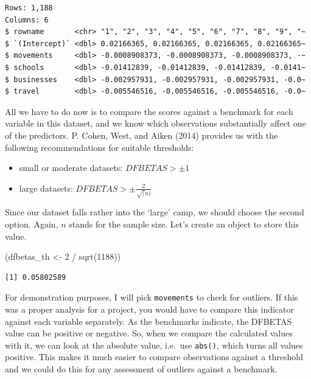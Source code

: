\documentclass[
  letterpaper,
  DIV=11,
  numbers=noendperiod]{scrreprt}
\newenvironment{Shaded}{\begin{snugshade}}{\end{snugshade}}
\newcommand{\DecValTok}[1]{\textcolor[rgb]{0.68,0.00,0.00}{#1}}
\newcommand{\FunctionTok}[1]{\textcolor[rgb]{0.28,0.35,0.67}{#1}}
\newcommand{\NormalTok}[1]{\textcolor[rgb]{0.00,0.23,0.31}{#1}}
\newcommand{\OtherTok}[1]{\textcolor[rgb]{0.00,0.23,0.31}{#1}}
\newcommand{\SpecialCharTok}[1]{\textcolor[rgb]{0.37,0.37,0.37}{#1}}
\begin{document}
\begin{verbatim}
Rows: 1,188
Columns: 6
$ rowname       <chr> "1", "2", "3", "4", "5", "6", "7", "8", "9", "~
$ `(Intercept)` <dbl> 0.02166365, 0.02166365, 0.02166365, 0.02166365~
$ movements     <dbl> -0.0008908373, -0.0008908373, -0.0008908373, -~
$ schools       <dbl> -0.01412839, -0.01412839, -0.01412839, -0.0141~
$ businesses    <dbl> -0.002957931, -0.002957931, -0.002957931, -0.0~
$ travel        <dbl> -0.005546516, -0.005546516, -0.005546516, -0.0~
\end{verbatim}

All we have to do now is to compare the scores against a benchmark for
each variable in this dataset, and we know which observations
substantially affect one of the predictors. P. Cohen, West, and Aiken
(2014) provides us with the following recommendations for suitable
thresholds:

\begin{itemize}
\item
  small or moderate datasets: \(DFBETAS > \pm 1\)
\item
  large datasets: \(DFBETAS > \pm\frac{2}{\sqrt(n)}\)
\end{itemize}

Since our dataset falls rather into the `large' camp, we should choose
the second option. Again, \(n\) stands for the sample size. Let's create
an object to store this value.

\begin{Shaded}
\begin{Highlighting}[]
\NormalTok{(dfbetas\_th }\OtherTok{\textless{}{-}} \DecValTok{2} \SpecialCharTok{/} \FunctionTok{sqrt}\NormalTok{(}\DecValTok{1188}\NormalTok{))}
\end{Highlighting}
\end{Shaded}

\begin{verbatim}
[1] 0.05802589
\end{verbatim}

For demonstration purposes, I will pick \texttt{movements} to check for
outliers. If this was a proper analysis for a project, you would have to
compare this indicator against each variable separately. As the
benchmarks indicate, the DFBETAS value can be positive or negative. So,
when we compare the calculated values with it, we can look at the
absolute value, i.e.~use \texttt{abs()}, which turns all values
positive. This makes it much easier to compare observations against a
threshold and we could do this for any assessment of outliers against a
benchmark.
\end{document}
